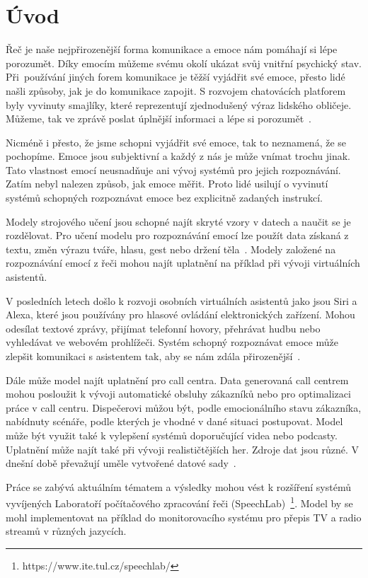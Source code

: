 \documentclass[FM,BP]{tulthesis}
\begin{document}
\chapter{Úvod} %
Řeč je naše nejpřirozenější forma komunikace a emoce nám pomáhají si lépe porozumět. Díky emocím můžeme svému okolí ukázat svůj vnitřní psychický stav. Při~používání jiných forem komunikace je těžší vyjádřit své emoce, přesto lidé našli způsoby, jak je do komunikace zapojit. S rozvojem chatovácích platforem byly vyvinuty smajlíky, které reprezentují zjednodušený výraz lidského obličeje. Můžeme, tak ve zprávě poslat úplnější informaci a lépe si porozumět~\cite{DBLP:journals/speech/AkcayO20}.

Nicméně i přesto, že jsme schopni vyjádřit své emoce, tak to neznamená, že se pochopíme. Emoce jsou subjektivní a každý z nás je může vnímat trochu jinak. Tato vlastnost emocí neusnadňuje ani vývoj systémů pro jejich rozpoznávání. Zatím nebyl nalezen způsob, jak emoce měřit. Proto lidé usilují o vyvinutí systémů schopných rozpoznávat emoce bez explicitně zadaných instrukcí.

Modely strojového učení jsou schopné najít skryté vzory v datech a naučit se je rozdělovat. Pro učení modelu pro rozpoznávání emocí lze použít data získaná z textu, změn výrazu tváře, hlasu, gest nebo držení těla~\cite{konar_chakraborty_2015}. Modely založené na rozpoznávání emocí z řeči mohou najít uplatnění na příklad při vývoji virtuálních asistentů.

V posledních letech došlo k rozvoji osobních virtuálních asistentů jako jsou Siri a Alexa, které jsou používány pro hlasové ovládání elektronických zařízení. Mohou odesílat textové zprávy, přijímat telefonní hovory, přehrávat hudbu nebo vyhledávat ve webovém prohlížeči. Systém schopný rozpoznávat emoce může zlepšit komunikaci s asistentem tak, aby se nám zdála přirozenější~\cite{DBLP:journals/corr/abs-1912-10458}.

Dále může model najít uplatnění pro call centra. Data generovaná call centrem mohou posloužit k vývoji automatické obsluhy zákazníků nebo pro optimalizaci práce v call centru. Dispečerovi můžou být, podle emocionálního stavu zákazníka, nabídnuty scénáře, podle kterých je vhodné v dané situaci postupovat. Model může být využit také k vylepšení systémů doporučující videa nebo podcasty. Uplatnění může najít také při vývoji realističtějších her. Zdroje dat jsou různé. V dnešní době převažují uměle vytvořené datové sady~\cite{konar_chakraborty_2015}.

Práce se zabývá aktuálním tématem a výsledky mohou vést k rozšíření systémů vyvíjených Laboratoří počítačového zpracování řeči (SpeechLab)~\footnote{https://www.ite.tul.cz/speechlab/}. Model by se mohl implementovat na příklad do monitorovacího systému pro přepis TV a radio streamů v různých jazycích.
\end{document}
